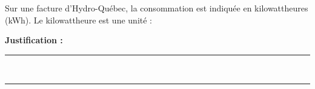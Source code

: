 Sur une facture d'Hydro-Québec, la consommation est indiquée en kilowattheures (kWh). Le kilowattheure est une unité :

\choices

\noindent\textbf{Justification :} \hrulefill \\[2.5ex]
\rule{\linewidth}{0.4pt} \\[2.5ex]
\rule{\linewidth}{0.4pt}
\vfill
